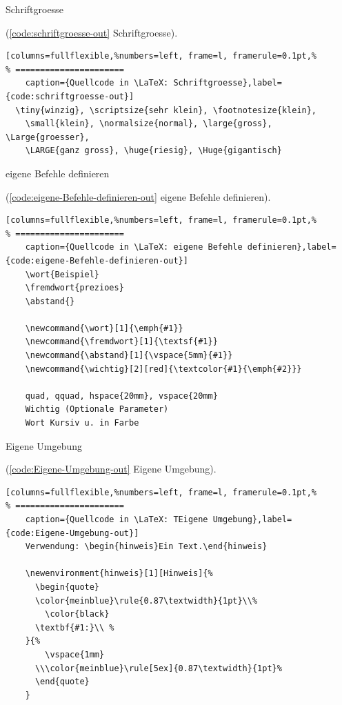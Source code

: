 Schriftgroesse

(\autoref{code:schriftgroesse-out} Schriftgroesse).
\lstset{language=[LaTeX]TeX} %
\begin{lstlisting}[columns=fullflexible,%numbers=left, frame=l, framerule=0.1pt,%
% ======================
	caption={Quellcode in \LaTeX: Schriftgroesse},label={code:schriftgroesse-out}]
  \tiny{winzig}, \scriptsize{sehr klein}, \footnotesize{klein},
	\small{klein}, \normalsize{normal}, \large{gross}, \Large{groesser},
	\LARGE{ganz gross}, \huge{riesig}, \Huge{gigantisch}
\end{lstlisting}

 eigene Befehle definieren

(\autoref{code:eigene-Befehle-definieren-out} eigene Befehle definieren).
\lstset{language=[LaTeX]TeX} %
\begin{lstlisting}[columns=fullflexible,%numbers=left, frame=l, framerule=0.1pt,%
% ======================
	caption={Quellcode in \LaTeX: eigene Befehle definieren},label={code:eigene-Befehle-definieren-out}]
	\wort{Beispiel}
	\fremdwort{prezioes}
	\abstand{}

	\newcommand{\wort}[1]{\emph{#1}}
	\newcommand{\fremdwort}[1]{\textsf{#1}}
	\newcommand{\abstand}[1]{\vspace{5mm}{#1}}
	\newcommand{\wichtig}[2][red]{\textcolor{#1}{\emph{#2}}}

	quad, qquad, hspace{20mm}, vspace{20mm}
	Wichtig (Optionale Parameter)
	Wort Kursiv u. in Farbe
\end{lstlisting}

Eigene Umgebung

(\autoref{code:Eigene-Umgebung-out} Eigene Umgebung).
\lstset{language=[LaTeX]TeX} %
\begin{lstlisting}[columns=fullflexible,%numbers=left, frame=l, framerule=0.1pt,%
% ======================
	caption={Quellcode in \LaTeX: TEigene Umgebung},label={code:Eigene-Umgebung-out}]
	Verwendung: \begin{hinweis}Ein Text.\end{hinweis}

	\newenvironment{hinweis}[1][Hinweis]{%
	  \begin{quote}
	  \color{meinblue}\rule{0.87\textwidth}{1pt}\\%
		\color{black}
	  \textbf{#1:}\\ %
	}{%
		\vspace{1mm}
	  \\\color{meinblue}\rule[5ex]{0.87\textwidth}{1pt}%
	  \end{quote}
	}
\end{lstlisting}

